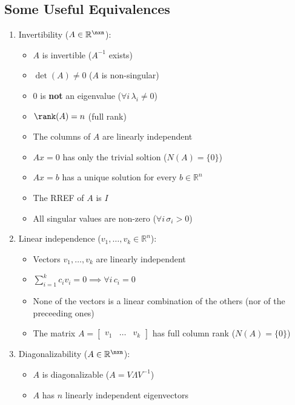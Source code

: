 \subsection{Some Useful Equivalences}
\begin{enumerate}
    \item Invertibility ($A \in \mathbb{R}^{\nxn}$):
        \begin{itemize}
            \item $A$ is invertible ($A^{-1}$ exists)
            \item $\det(A)\ne 0$ ($A$ is non-singular)
            \item $0$ is \textbf{not} an eigenvalue ($\forall i \, \lambda_i\ne 0$)
            \item $\rank(A) = n$ (full rank)
            \item The columns of $A$ are linearly independent
            \item $Ax = 0$ has only the trivial soltion ($N(A) = \{0\}$)
            \item $Ax = b$ has a unique solution for every $b \in \mathbb{R}^n$
            \item The RREF of $A$ is $I$
            \item All singular values are non-zero ($\forall i \, \sigma_i > 0$)
        \end{itemize}
    \item Linear independence ($v_1, \dots, v_k \in \mathbb{R}^n$):
        \begin{itemize}
            \item Vectors $v_1, \dots, v_k$ are linearly independent
            \item $\sum_{i=1}^{k}c_i v_i = 0 \implies \forall i \, c_i = 0$
            \item None of the vectors is a linear combination of the others (nor of the preceeding ones)
            \item The matrix $A = \begin{bmatrix}v_1 & \dots & v_k\end{bmatrix}$ has full column rank ($N(A) = \{0\}$)
        \end{itemize}
    \item Diagonalizability ($A \in \mathbb{R}^{\nxn}$):
        \begin{itemize}
            \item $A$ is diagonalizable ($A = V \Lambda V^{-1}$)
            \item $A$ has $n$ linearly independent eigenvectors

\end{itemize}
\end{enumerate}
